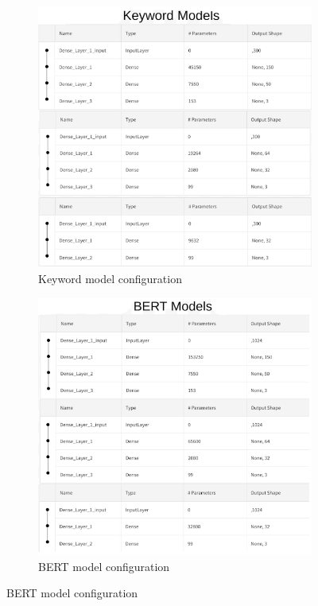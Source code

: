 \documentclass[10pt,twocolumn,letterpaper]{article}
\begin{document}
\begin{figure}
\begin{subfigure}{\linewidth}
  \includegraphics[width=\linewidth]{keyword_model}
  \caption{Keyword model configuration}
  \label{fig:keyword_model}
\end{subfigure}
\begin{subfigure}{\linewidth}
  \includegraphics[width=\linewidth]{bert_model}
  \caption{BERT model configuration}
  \label{fig:bert_model}
  \end{subfigure}
\end{figure}
\end{document}
